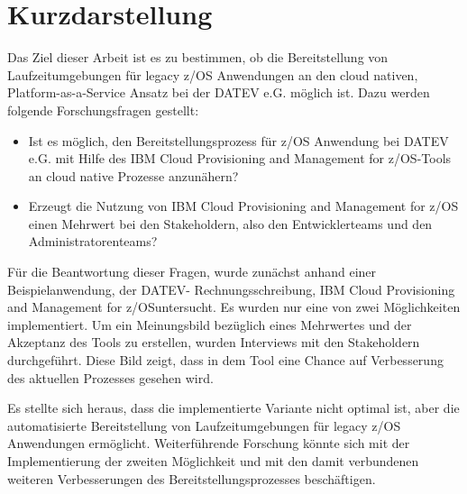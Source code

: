 \thispagestyle{empty}
\section*{Kurzdarstellung}
\label{sec:kurzdarstellung}
Das Ziel dieser Arbeit ist es zu bestimmen, ob die Bereitstellung von Laufzeitumgebungen für legacy z/OS Anwendungen an den cloud nativen, Platform-as-a-Service Ansatz bei der DATEV e.G. möglich ist.
Dazu werden folgende Forschungsfragen gestellt:
\begin{itemize}
\item Ist es möglich, den Bereitstellungsprozess für z/OS Anwendung bei DATEV e.G. mit Hilfe des \glqq IBM Cloud Provisioning and Management for z/OS\grqq-Tools an cloud native Prozesse anzunähern?
\item Erzeugt die Nutzung von \glqq IBM Cloud Provisioning and Management for z/OS\grqq{} einen Mehrwert bei den Stakeholdern, also den Entwicklerteams und den Administratorenteams?
\end{itemize}

Für die Beantwortung dieser Fragen, wurde zunächst anhand einer Beispielanwendung, der DATEV- Rechnungsschreibung, \glqq IBM Cloud Provisioning and Management for z/OS\grqq untersucht.
Es wurden nur eine von zwei Möglichkeiten implementiert.
Um ein Meinungsbild bezüglich eines Mehrwertes und der Akzeptanz  des Tools zu erstellen, wurden Interviews mit den Stakeholdern durchgeführt.
Diese Bild zeigt, dass in dem Tool eine Chance auf Verbesserung des aktuellen Prozesses gesehen wird.

Es stellte sich heraus, dass die implementierte Variante nicht optimal ist, aber die automatisierte Bereitstellung von Laufzeitumgebungen für legacy z/OS Anwendungen ermöglicht.
Weiterführende Forschung könnte sich mit der Implementierung der zweiten Möglichkeit und mit den damit verbundenen weiteren Verbesserungen des Bereitstellungsprozesses beschäftigen.




